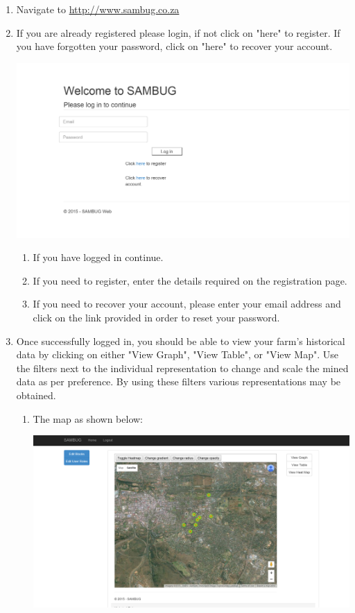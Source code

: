\documentclass[11pt,a4paper,titlepage]{article}
\begin{document}
	\begin{enumerate}
		\item Navigate to \url{http://www.sambug.co.za}
		\item If you are already registered please login, if not click on "here" to register. If you have forgotten your password, click on "here" to recover your account. 
	\begin{center}
		\includegraphics[scale=0.7]{login_page.png}
	\end{center}
		\begin{enumerate}
			\item If you have logged in continue.
			\item If you need to register, enter the details required on the registration page.
			\item If you need to recover your account, please enter your email address and click on the link provided in order to reset your password.
		\end{enumerate}
\item Once successfully logged in, you should be able to view your farm's historical data by clicking on either "View Graph", "View Table", or "View Map". Use the filters next to the individual representation to change and scale the mined data as per preference. By using these filters various representations may be obtained.
		\begin{enumerate}
			\item The map as shown below:
			\begin{center}
				\includegraphics[scale=0.3]{map.png}

\end{center}
\end{enumerate}
\end{enumerate}
\end{document}
